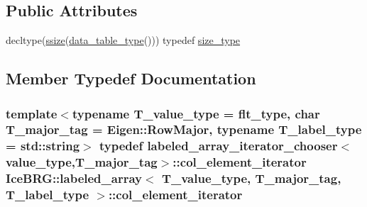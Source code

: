\subsection*{Public Attributes}
\begin{DoxyCompactItemize}
\item 
decltype(\hyperlink{namespaceIceBRG_a1c98028bf4680f4efbc1e733387e8372}{ssize}(\hyperlink{classIceBRG_1_1labeled__array_a43d1c710fe591f9610ab9e9827aabba6}{data\+\_\+table\+\_\+type}())) typedef \hyperlink{classIceBRG_1_1labeled__array_a9c667890832a65f117cd2806686ff3ef}{size\+\_\+type}
\end{DoxyCompactItemize}


\subsection{Member Typedef Documentation}
\hypertarget{classIceBRG_1_1labeled__array_a8f65ba678f8d25c85109d51dd522950d}{}
\subsubsection[{col\+\_\+element\+\_\+iterator}]{\setlength{\rightskip}{0pt plus 5cm}template$<$typename T\+\_\+value\+\_\+type = flt\+\_\+type, char T\+\_\+major\+\_\+tag = Eigen\+::\+Row\+Major, typename T\+\_\+label\+\_\+type = std\+::string$>$ typedef {\bf labeled\+\_\+array\+\_\+iterator\+\_\+chooser}$<${\bf value\+\_\+type},T\+\_\+major\+\_\+tag$>$\+::{\bf col\+\_\+element\+\_\+iterator} {\bf Ice\+B\+R\+G\+::labeled\+\_\+array}$<$ T\+\_\+value\+\_\+type, T\+\_\+major\+\_\+tag, T\+\_\+label\+\_\+type $>$\+::{\bf col\+\_\+element\+\_\+iterator}}\label{classIceBRG_1_1labeled__array_a8f65ba678f8d25c85109d51dd522950d}
\hypertarget{classIceBRG_1_1labeled__array_a5013bbfc828083b72537e79ded5fe56d}{}
